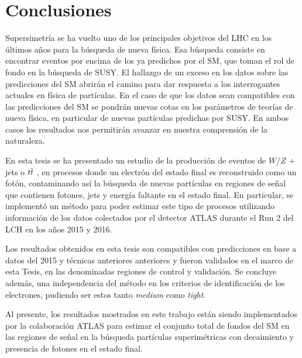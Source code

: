 \chapter{Conclusiones}

Supersimetría se ha vuelto uno de los principales objetivos del LHC en los últimos años para la búsqueda de nueva física. Esa búsqueda consiste en encontrar eventos por encima de los ya predichos por el SM, que toman el rol de fondo en la búsqueda de SUSY. El hallazgo de un exceso en los datos sobre las predicciones del SM abrirán el camino para dar respuesta a los interrogantes actuales en física de partículas. En el caso de que los datos sean compatibles con las predicciones del SM se pondrán nuevas cotas en los parámetros de teorías de nueva física, en particular de nuevas partículas predichas por SUSY. En ambos casos los resultados nos permitirán avanzar en nuestra comprensión de la naturaleza. 

En esta tesis se ha presentado un estudio de la producción de eventos de $W$/$Z$ + jets o $t \overline{t}$ , en procesos donde un electrón del estado final es reconstruido como un fotón, contaminando así la búsqueda de nuevas partículas en regiones de señal que contienen fotones, jets y energía faltante en el estado final. En particular, se implementó un método para poder estimar este tipo de procesos utilizando información de los datos colectados por el detector ATLAS durante el Run 2 del LCH en los años 2015 y 2016.

Los resultados obtenidos en esta tesis son compatibles con predicciones en base a datos del 2015 y técnicas anteriores anteriores  y fueron validados en el marco de esta Tesis, en las denominadas regiones de control y validación. Se concluye además, una independencia del método en los criterios de identificación de los electrones, pudiendo ser estos tanto \textit{medium} como \textit{tight}.

Al presente, los resultados mostrados en este trabajo están siendo implementados por la colaboración ATLAS para estimar el conjunto total de fondos del SM en las regiones de señal en la búsqueda partículas superimétricas con decaimiento y presencia de fotones en el estado final.
